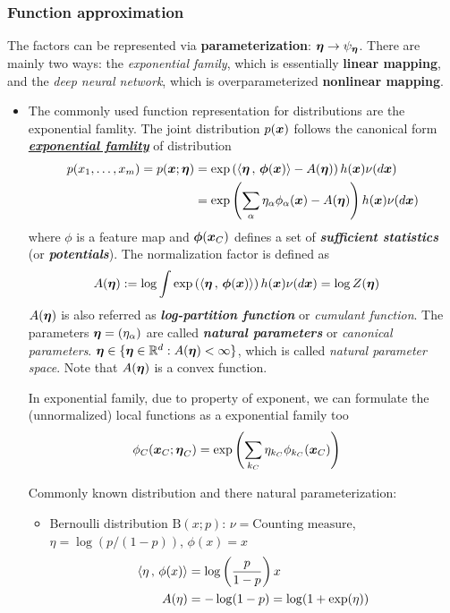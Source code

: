 \documentclass[11pt]{article}
\begin{document}
\subsubsection{Function approximation}
The factors can be represented via \textbf{parameterization}: $\boldsymbol{\eta} \rightarrow \psi_{\boldsymbol{\eta}}$. There are mainly two ways: the \emph{exponential family}, which is essentially \textbf{linear mapping}, and the \emph{deep neural network}, which is overparameterized \textbf{nonlinear mapping}. 
\begin{itemize}
\item  The commonly used function representation for distributions are the exponential famlity. The joint distribution $p(\boldsymbol{x})$ follows the canonical form \underline{\emph{\textbf{exponential famlity}}} of distribution
\begin{align}
p(x_1, \ldots, x_{m}) = p(\boldsymbol{x}; \boldsymbol{\eta}) &= \exp\left(\left\langle \boldsymbol{\eta}\,,\, \boldsymbol{\phi}(\boldsymbol{x}) \right\rangle - A(\boldsymbol{\eta})\right)h(\boldsymbol{x})\nu(d\boldsymbol{x}) \nonumber \\
&= \exp\left(\sum_{\alpha}\eta_{\alpha}\phi_{\alpha}(\boldsymbol{x}) -  A(\boldsymbol{\eta})\right)h(\boldsymbol{x})\nu(d\boldsymbol{x}) \label{eqn: exp_fam}
\end{align} where $\phi$ is a feature map  and $\boldsymbol{\phi}(\boldsymbol{x}_{C})$ defines a set of \emph{\textbf{sufficient statistics}} (or \emph{\textbf{potentials}}). The normalization factor is defined as
\begin{align*}
 A(\boldsymbol{\eta}) &:= \log \int \exp\left( \left\langle \boldsymbol{\eta}\,,\, \boldsymbol{\phi}(\boldsymbol{x}) \right\rangle \right)h(\boldsymbol{x})\nu(d\boldsymbol{x}) = \log Z(\boldsymbol{\eta})
\end{align*} $A(\boldsymbol{\eta})$ is also referred as \textbf{\emph{log-partition function}} or \emph{cumulant function}. The parameters $\boldsymbol{\eta} = (\eta_{\alpha})$ are called \textbf{\emph{natural parameters}}  or \emph{canonical parameters}. $\boldsymbol{\eta} \in \{\boldsymbol{\eta} \in {\mathbb R}^{d}: A(\boldsymbol{\eta}) < \infty\}$, which is called \emph{natural parameter space}. Note that $A(\boldsymbol{\eta})$ is a convex function. 

In exponential family, due to property of exponent, we can formulate the (unnormalized) local functions as a exponential family too
\begin{align*}
\phi_{C}(\boldsymbol{x}_{C}; \boldsymbol{\eta}_{C}) &= \exp\left(\sum_{k_{C}}\eta_{k_{C}}\phi_{k_{C}}(\boldsymbol{x}_{C})\right)
\end{align*}

Commonly known distribution and there natural parameterization:
\begin{itemize}
\item Bernoulli distribution $\text{B}(x; p)$: $\nu = \text{Counting measure}$,  $\eta = \log(p/(1-p))$, $\phi(x) = x$
\begin{align*}
\left\langle \eta\,,\, \phi(x) \right\rangle &= \log\left(\frac{p}{1-p}\right)x\\
A(\eta) &=-\log(1-p) =  \log(1 + \exp(\eta))  
\end{align*}


\end{itemize}
\end{itemize}
\end{document}
